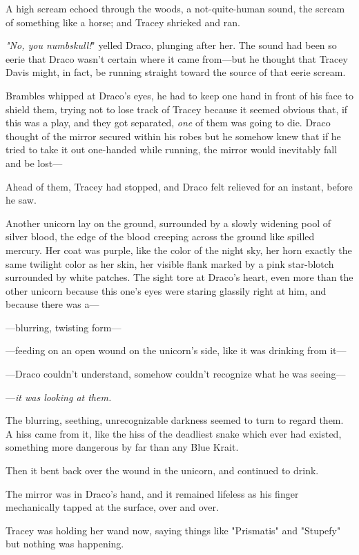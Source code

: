 A high scream echoed through the woods, a not-quite-human sound, the scream of 
something like a horse; and Tracey shrieked and ran.

\emph{"No, you numbskull!}" yelled Draco, plunging after her. The sound had 
been so eerie that Draco wasn't certain where it came from---but he thought 
that Tracey Davis might, in fact, be running straight toward the source of that 
eerie scream.

Brambles whipped at Draco's eyes, he had to keep one hand in front of his face 
to shield them, trying not to lose track of Tracey because it seemed obvious 
that, if this was a play, and they got separated, \emph{one} of them was going 
to die. Draco thought of the mirror secured within his robes but he somehow 
knew that if he tried to take it out one-handed while running, the mirror would 
inevitably fall and be lost---

Ahead of them, Tracey had stopped, and Draco felt relieved for an instant, 
before he saw.

Another unicorn lay on the ground, surrounded by a slowly widening pool of 
silver blood, the edge of the blood creeping across the ground like spilled 
mercury. Her coat was purple, like the color of the night sky, her horn exactly 
the same twilight color as her skin, her visible flank marked by a pink 
star-blotch surrounded by white patches. The sight tore at Draco's heart, even 
more than the other unicorn because this one's eyes were staring glassily right 
at him, and because there was a---

---blurring, twisting form---

---feeding on an open wound on the unicorn's side, like it was drinking from 
it---

---Draco couldn't understand, somehow couldn't recognize what he was seeing---

---\emph{it was looking at them.}

The blurring, seething, unrecognizable darkness seemed to turn to regard them. 
A hiss came from it, like the hiss of the deadliest snake which ever had 
existed, something more dangerous by far than any Blue Krait.

Then it bent back over the wound in the unicorn, and continued to drink.

The mirror was in Draco's hand, and it remained lifeless as his finger 
mechanically tapped at the surface, over and over.

Tracey was holding her wand now, saying things like "Prismatis" and "Stupefy" 
but nothing was happening.

